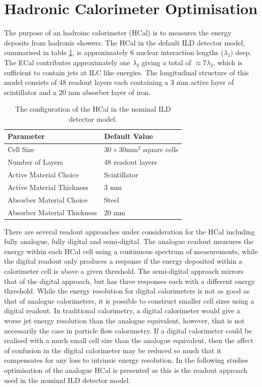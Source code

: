 \section{Hadronic Calorimeter Optimisation}
\label{sec:hcal}
The purpose of an hadroinc calorimeter (HCal) is to measures the energy deposits from hadronic showers.  The HCal in the default ILD detector model, summarised in table \ref{table:defaultildhcal}, is approximately 6 nuclear interaction lengths ($\lambda_{I}$) deep.  The ECal contributes approximately one $\lambda_{I}$ giving a total of $\approx 7 \lambda_{I}$, which is sufficient to contain jets at ILC like energies.  The longitudinal structure of this model consists of 48 readout layers each containing a 3 mm active layer of scintillator and a 20 mm absorber layer of iron.  

\begin{table}[h!]
\centering
\begin{tabular}{ l l}
\hline
Parameter & Default Value \\
\hline
Cell Size & $30 \times 30 \text{mm}^{2}$ square cells \\
Number of Layers & 48 readout layers \\
Active Material Choice & Scintillator \\
Active Material Thickness & 3 mm  \\
Absorber Material Choice & Steel \\
Absorber Material Thickness & 20 mm \\
\hline
\end{tabular}
\caption[The configuration of the HCal in the nominal ILD detector model.]{The configuration of the HCal in the nominal ILD detector model.}
\label{table:defaultildhcal}
\end{table}

There are several readout approaches under consideration for the HCal including fully analogue, fully digital and semi-digital.  The analogue readout measures the energy within each HCal cell using a continuous spectrum of measurements, while the digital readout only produces a response if the energy deposited within a calorimeter cell is above a given threshold.  The semi-digital approach mirrors that of the digital approach, but has three responses each with a different energy threshold.  While the energy resolution for digital calorimeters is not as good as that of analogue calorimeters, it is possible to construct smaller cell sizes using a digital readout.  In traditional calorimetry, a digital calorimeter would give a worse jet energy resolution than the analogue equivalent, however, that is not necessarily the case in particle flow calorimetry.  If a digital calorimeter could be realised with a much small cell size than the analogue equivalent, then the affect of confusion in the digital calorimeter may be reduced so much that it compensates for any loss to intrinsic energy resolution.  In the following studies optimisation of the analogue HCal is presented as this is the readout approach used in the nominal ILD detector model.  

